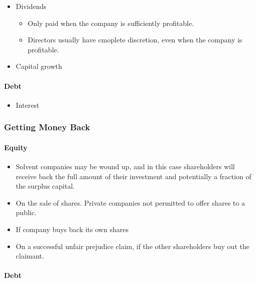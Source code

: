 \documentclass[
]{article}
\providecommand{\tightlist}{%
  \setlength{\itemsep}{0pt}\setlength{\parskip}{0pt}}
\begin{document}
\begin{itemize}
\tightlist
\item
  Dividends

  \begin{itemize}
  \tightlist
  \item
    Only paid when the company is sufficiently profitable.
  \item
    Directors usually have cmoplete discretion, even when the company is
    profitable.
  \end{itemize}
\item
  Capital growth
\end{itemize}

\hypertarget{debt}{%
\paragraph{Debt}\label{debt}}

\begin{itemize}
\tightlist
\item
  Interest
\end{itemize}

\hypertarget{getting-money-back}{%
\subsubsection{Getting Money Back}\label{getting-money-back}}

\hypertarget{equity-1}{%
\paragraph{Equity}\label{equity-1}}

\begin{itemize}
\tightlist
\item
  Solvent companies may be wound up, and in this case shareholders will
  receive back the full amount of their investment and potentially a
  fraction of the surplus capital.
\item
  On the sale of shares. Private companies not permitted to offer shares
  to a public.
\item
  If company buys back its own shares
\item
  On a successful unfair prejudice claim, if the other shareholders buy
  out the claimant.
\end{itemize}

\hypertarget{debt-1}{%
\paragraph{Debt}\label{debt-1}}
\end{document}
